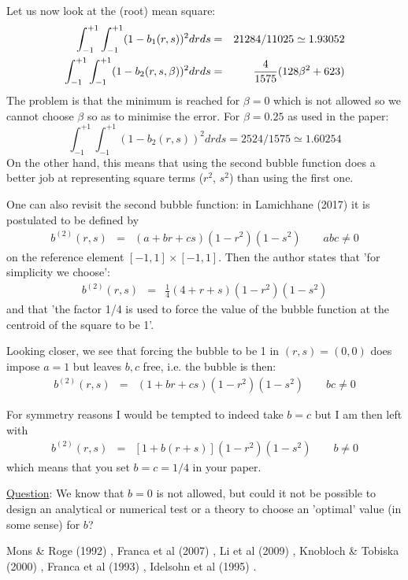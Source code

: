 Let us now look at the (root) mean square:
\begin{eqnarray}
\int_{-1}^{+1} \int_{-1}^{+1} (1-b_1(r,s))^2 dr ds &=& 21284/11025 \simeq 1.93052 \nonumber\\
\int_{-1}^{+1} \int_{-1}^{+1} (1-b_2(r,s,\beta))^2 dr ds &=& \frac{4}{1575} (128 \beta^2  + 623) 
\end{eqnarray}
The problem is that the minimum is reached for $\beta=0$ which is not allowed so 
we cannot choose $\beta$ so as to minimise the error.
For $\beta=0.25$ as used in the paper:
\[
\int_{-1}^{+1} \int_{-1}^{+1} (1-b_2(r,s))^2 dr ds = 2524/1575 \simeq 1.60254 
\]
On the other hand, this means that using the second bubble function does a better job  
at representing square terms ($r^2$, $s^2$) than using the first one. 




\newpage
One can also revisit the second bubble function: in Lamichhane (2017) \cite{lami17}
it is postulated to be defined by 
\begin{eqnarray}
b^{(2)}(r,s) &=& (a+br+cs)(1-r^2)(1-s^2) \qquad abc\neq 0
\end{eqnarray}
on the reference element $[-1,1]\times [-1,1]$. Then the author 
states that 'for simplicity we choose':
\begin{eqnarray}
b^{(2)}(r,s) &=& \frac{1}{4} (4+r+s)(1-r^2)(1-s^2) 
\end{eqnarray}
and that 'the factor 1/4 is used to force the value of the bubble function at
the centroid of the square to be 1'.

Looking closer, we see that forcing the bubble to be 1 in $(r,s)=(0,0)$ does impose
$a=1$ but leaves $b,c$ free, i.e. the bubble is then:
\begin{eqnarray}
b^{(2)}(r,s) &=& (1+br+cs)(1-r^2)(1-s^2) \qquad bc\neq 0
\end{eqnarray}

For symmetry reasons I would be tempted to indeed take $b=c$ but I am then left with 
\begin{eqnarray}
b^{(2)}(r,s) &=&  [1+b(r+s)](1-r^2)(1-s^2) \qquad b\neq 0
\end{eqnarray}
which means that you set $b=c=1/4$ in your paper. 

\underline{Question}: We know that $b=0$ is not allowed, but could it not be 
possible to design an analytical or numerical test or a 
theory to choose an 'optimal' value (in some sense) for $b$?  



\Literature Mons \& Roge (1992) \cite{moro92}, Franca et al (2007) \cite{fros07}, 
Li et al (2009) \cite{lihc09}, Knobloch \& Tobiska (2000) \cite{knto00}, 
Franca et al (1993) \cite{frha93}, Idelsohn et al (1995) \cite{idsn95}.





